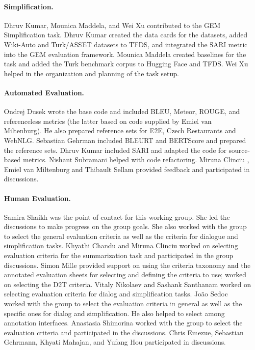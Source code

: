 \documentclass[11pt,a4paper]{article}
\begin{document}
\paragraph{Simplification.} Dhruv Kumar, Mounica Maddela, and Wei Xu contributed to the GEM Simplification task. Dhruv Kumar created the data cards for the datasets, added Wiki-Auto and Turk/ASSET datasets to TFDS, and integrated the SARI metric \cite{xu-etal-2016-optimizing} into the GEM evaluation framework. Mounica Maddela created baselines for the task and added the Turk benchmark corpus to Hugging Face and TFDS. Wei Xu helped in the organization and planning of the task setup. 

\paragraph{Automated Evaluation.} Ondrej Dusek wrote the base code and included BLEU, Meteor, ROUGE, and referenceless metrics (the latter based on code supplied by Emiel van
Miltenburg). He also prepared reference sets for E2E, Czech
Restaurants and WebNLG. Sebastian Gehrman included BLEURT and BERTScore and prepared the reference sets. Dhruv Kumar included SARI and adapted the code for source-based metrics. Nishant Subramani helped with code refactoring. Miruna Clinciu , Emiel van Miltenburg and Thibault Sellam provided feedback and participated in discussions.

\paragraph{Human Evaluation.} Samira Shaikh was the point of contact for this working group. She led the discussions to make progress on the group goals. She also worked with the group to select the general evaluation criteria as well as the criteria for dialogue and simplification tasks. 
Khyathi Chandu and Miruna Clinciu worked on selecting evaluation criteria for the summarization task and participated in the group discussions.
Simon Mille provided support on using the criteria taxonomy and the annotated evaluation sheets for selecting and defining the criteria to use; worked on selecting the D2T criteria.
Vitaly Nikolaev and Sashank Santhanam  worked on selecting evaluation criteria for dialog and simplification tasks.
João Sedoc worked with the group to select the evaluation criteria in general as well as the specific ones for dialog and simplification. He also helped to select among annotation interfaces.
Anastasia Shimorina worked with the group to select the evaluation criteria and participated in the discussions.
Chris Emezue, Sebastian Gehrmann, Khyati Mahajan, and Yufang Hou participated in discussions.
\end{document}
